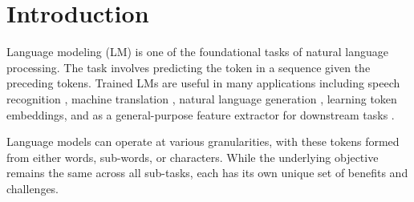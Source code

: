 \documentclass{article}
\newcommand{\enwik}{\texttt{enwik8}\xspace}
\begin{document}





\printAffiliationsAndNotice{\icmlEqualContribution} 

\begin{abstract}
Many of the leading approaches in language modeling introduce novel, complex and specialized architectures.
We take existing state-of-the-art word level language models based on LSTMs and QRNNs and extend them to both larger vocabularies as well as character-level granularity.
When properly tuned, LSTMs and QRNNs achieve state-of-the-art results on character-level (Penn Treebank, \enwik) and word-level (WikiText-103) datasets, respectively.
Results are obtained in only 12 hours (WikiText-103) to 2 days (\enwik) using a single modern GPU.
\end{abstract}

\section{Introduction}

Language modeling (LM) is one of the foundational tasks of natural language processing.
The task involves predicting the  token in a sequence given the  preceding tokens.
Trained LMs are useful in many applications including speech recognition \citep{yu2014automatic}, machine translation \citep{koehn2009statistical}, natural language generation \citep{radford2017learning, smerity-revisiting}, learning token embeddings, and as a general-purpose feature extractor for downstream tasks \cite{elmo}.

Language models can operate at various granularities, with these tokens formed from either words, sub-words, or characters.
While the underlying objective remains the same across all sub-tasks, each has its own unique set of benefits and challenges.
\end{document}
